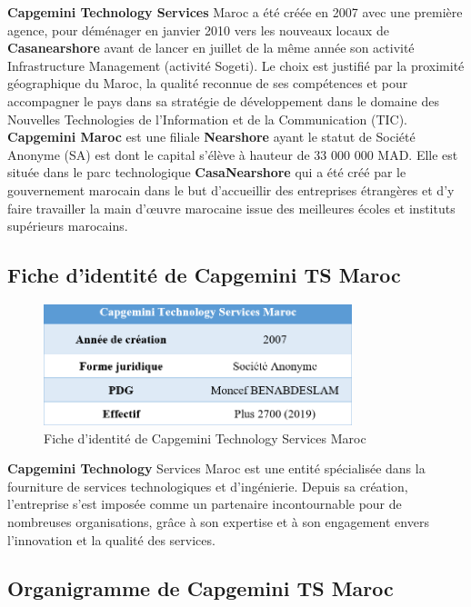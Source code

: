 \documentclass[12pt,a4paper]{report}
\begin{document}
\textbf{Capgemini Technology Services} Maroc a été créée en 2007 avec une première agence, pour déménager en janvier 2010 vers les nouveaux locaux de \textbf{Casanearshore} avant de lancer en juillet de la même année son activité Infrastructure Management (activité Sogeti). Le choix est justifié par la proximité géographique du Maroc, la qualité reconnue de ses compétences et pour accompagner le pays dans sa stratégie de développement dans le domaine des Nouvelles Technologies de l'Information et de la Communication (TIC). \textbf{Capgemini Maroc} est une filiale \textbf{Nearshore} ayant le statut de Société Anonyme (SA) est dont le capital s'élève à hauteur de 33 000 000 MAD. Elle est située dans le parc technologique \textbf{CasaNearshore} qui a été créé par le gouvernement marocain dans le but d'accueillir des entreprises étrangères et d'y faire travailler la main d'œuvre marocaine issue des meilleures écoles et instituts supérieurs marocains.

\subsection{Fiche d'identité de Capgemini TS Maroc}

\begin{figure}[htbp]
    \centering
    \includegraphics[width=0.8\textwidth]{latex_media/media/image4.png}
    \caption{Fiche d'identité de Capgemini Technology Services Maroc}
    \label{fig:fiche-capgemini-ts}
\end{figure}

\textbf{Capgemini Technology} Services Maroc est une entité spécialisée dans la fourniture de services technologiques et d'ingénierie. Depuis sa création, l'entreprise s'est imposée comme un partenaire incontournable pour de nombreuses organisations, grâce à son expertise et à son engagement envers l'innovation et la qualité des services.

\subsection{Organigramme de Capgemini TS Maroc}
\end{document}
